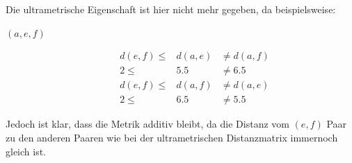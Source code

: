 \documentclass{homework}
\begin{document}
\begin{enumerate}
\begin{enumerate}
Die ultrametrische Eigenschaft ist hier nicht mehr gegeben, da beispielsweise:
\begin{description}
\item[$(a,e,f)$] \begin{eqnarray*}
d(e,f) \leq & d(a,e) & \neq d(a,f)\\
2 \leq & 5.5 & \neq 6.5\\
d(e,f) \leq & d(a,f) & \neq d(a,e)\\
2 \leq & 6.5 & \neq 5.5
\end{eqnarray*}
\end{description}
Jedoch ist klar, dass die Metrik additiv bleibt, da die Distanz vom $(e,f)$ Paar
zu den anderen Paaren wie bei der ultrametrischen Distanzmatrix immernoch gleich
ist.
\end{enumerate}



\end{enumerate}
\end{document}
